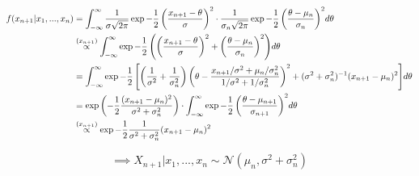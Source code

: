 \documentclass[a4paper]{article}
\begin{document}
                \begin{align*}
                    f(x_{n + 1} | x_1, ..., x_n) & = \int_{-\infty}^\infty
                        \frac{1}{\sigma\sqrt{2\pi}} \exp{-\frac{1}{2}\left(
                        \frac{x_{n+1} - \theta}{\sigma}\right)^2} \cdot
                        \frac{1}{\sigma_n\sqrt{2\pi}} \exp{-\frac{1}{2}\left(
                        \frac{\theta - \mu_n}{\sigma_n}\right)^2} d\theta \\
                    & \stackrel{({x_{n+1}})}{\propto} \int_{-\infty}^\infty \exp{-\frac{1}{2}
                        \left(\left(\frac{x_{n+1} - \theta}{\sigma}\right)^2 +
                        \left(\frac{\theta - \mu_n}{\sigma_n}\right)^2\right)}
                        d\theta \\
                    & = \int_{-\infty}^\infty \exp{-\frac{1}{2}\left[\left(
                        \frac{1}{\sigma^2} + \frac{1}{\sigma_n^2}\right)\left(
                        \theta - \frac{x_{n+1}/\sigma^2 + \mu_n/\sigma_n^2}
                        {1/\sigma^2 + 1/\sigma_n^2}\right)^2 + (\sigma^2 +
                        \sigma_n^2)^{-1}(x_{n+1} - \mu_n)^2\right]} d\theta \\
                    & = \exp{\left(-\frac{1}{2}\frac{(x_{n+1} - \mu_n)^2}{
                        \sigma^2 + \sigma_n^2}\right)} \cdot \int_{-\infty}
                        ^\infty \exp{-\frac{1}{2}\left(\frac{\theta - \mu_{n+1}}
                        {\sigma_{n+1}}\right)^2} d\theta \\
                    & \stackrel{({x_{n + 1}})}{\propto} \exp{-\frac{1}{2} \frac{1}{\sigma^2 +
                        \sigma_n^2} (x_{n+1} - \mu_n)^2}
                \end{align*}

                $$
                    \implies X_{n+1} | x_1, ..., x_n \sim \mathcal{N}(\mu_n,
                    \sigma^2 + \sigma_n^2)
                $$
\end{document}
